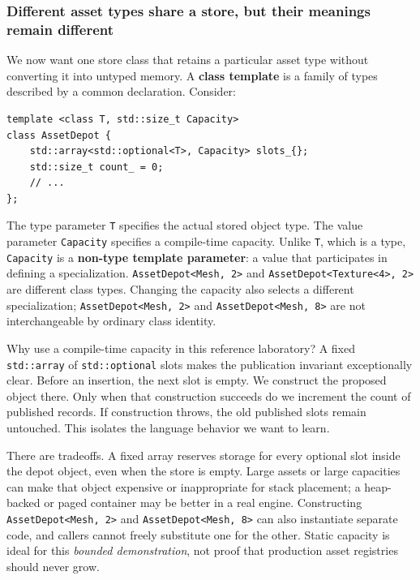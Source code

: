 \subsubsection{Different asset types share a store, but their meanings remain different}\label{different-asset-types-share-a-store-but-their-meanings-remain-different}

We now want one store class that retains a particular asset type without converting it into untyped memory. A \textbf{class template} is a family of types described by a common declaration. Consider:

\begin{verbatim}
template <class T, std::size_t Capacity>
class AssetDepot {
    std::array<std::optional<T>, Capacity> slots_{};
    std::size_t count_ = 0;
    // ...
};
\end{verbatim}

The type parameter \texttt{T} specifies the actual stored object type. The value parameter \texttt{Capacity} specifies a compile-time capacity. Unlike \texttt{T}, which is a type, \texttt{Capacity} is a \textbf{non-type template parameter}: a value that participates in defining a specialization. \texttt{AssetDepot\textless{}Mesh,\ 2\textgreater{}} and \texttt{AssetDepot\textless{}Texture\textless{}4\textgreater{},\ 2\textgreater{}} are different class types. Changing the capacity also selects a different specialization; \texttt{AssetDepot\textless{}Mesh,\ 2\textgreater{}} and \texttt{AssetDepot\textless{}Mesh,\ 8\textgreater{}} are not interchangeable by ordinary class identity.

Why use a compile-time capacity in this reference laboratory? A fixed \texttt{std::array} of \texttt{std::optional} slots makes the publication invariant exceptionally clear. Before an insertion, the next slot is empty. We construct the proposed object there. Only when that construction succeeds do we increment the count of published records. If construction throws, the old published slots remain untouched. This isolates the language behavior we want to learn.

There are tradeoffs. A fixed array reserves storage for every optional slot inside the depot object, even when the store is empty. Large assets or large capacities can make that object expensive or inappropriate for stack placement; a heap-backed or paged container may be better in a real engine. Constructing \texttt{AssetDepot\textless{}Mesh,\ 2\textgreater{}} and \texttt{AssetDepot\textless{}Mesh,\ 8\textgreater{}} can also instantiate separate code, and callers cannot freely substitute one for the other. Static capacity is ideal for this \emph{bounded demonstration}, not proof that production asset registries should never grow.

